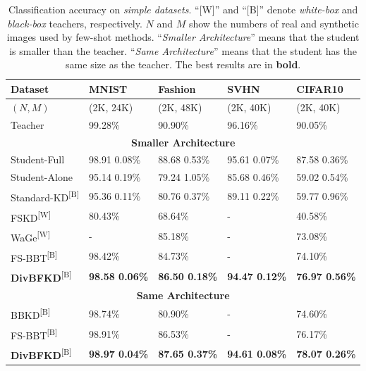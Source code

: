 \begin{table}[ht]
    \centering
    \caption{Classification accuracy on \textit{simple datasets}. ``[W]'' and ``[B]'' denote \textit{white-box} and \textit{black-box} teachers, respectively. $N$ and $M$ show the numbers of real and synthetic images used by few-shot methods. ``\textit{Smaller Architecture}'' means that the student is smaller than the teacher. ``\textit{Same Architecture}'' means that the student has the same size as the teacher. The best results are in \textbf{bold}.}
    \label{ch3:tab:ResultsFewClasses}
    \begin{tabular}{|l|l|l|l|l|}
        \hline
        \textbf{Dataset} & \textbf{MNIST} & \textbf{Fashion} & \textbf{SVHN} & \textbf{CIFAR10}\\
        \hline
        $(N,M)$         & (2K, 24K) & (2K, 48K) & (2K, 40K) & (2K, 40K)\\
        Teacher         & 99.28\% & 90.90\% & 96.16\% & 90.05\%\\
        \hline
        \multicolumn{5}{|c|}{\textbf{Smaller Architecture}}\\
        Student-Full    & 98.91 0.08\% & 88.68 0.53\% & 95.61 0.07\% & 87.58 0.36\%\\
        Student-Alone   & 95.14 0.19\% & 79.24 1.05\% & 85.68 0.46\% & 59.02 0.54\%\\
        Standard-KD\textsuperscript{[B]} & 95.36 0.11\% & 80.76 0.37\% & 89.11 0.22\% & 59.77 0.96\%\\
        FSKD\textsuperscript{[W]}   & 80.43\% & 68.64\% & - & 40.58\%\\
        WaGe\textsuperscript{[W]}   & - & 85.18\% & - & 73.08\%\\
        FS-BBT\textsuperscript{[B]} & 98.42\% & \multicolumn{1}{l|}{84.73\%} & - & 74.10\%\\
        \textbf{DivBFKD}\textsuperscript{[B]} & \textbf{98.58 0.06\%} & \textbf{86.50 0.18\%} & \textbf{94.47 0.12\%} & \textbf{76.97 0.56\%}\\
        \hline
        \multicolumn{5}{|c|}{\textbf{Same Architecture}}\\
        BBKD\textsuperscript{[B]}   & 98.74\% & 80.90\% & - & 74.60\%\\
        FS-BBT\textsuperscript{[B]} & 98.91\% & 86.53\% & - & 76.17\%\\
        \textbf{DivBFKD}\textsuperscript{[B]} & \textbf{98.97 0.04\%} & \textbf{87.65 0.37\%} & \textbf{94.61 0.08\%} & \textbf{78.07 0.26\%}\\
    \end{tabular}
\end{table}


